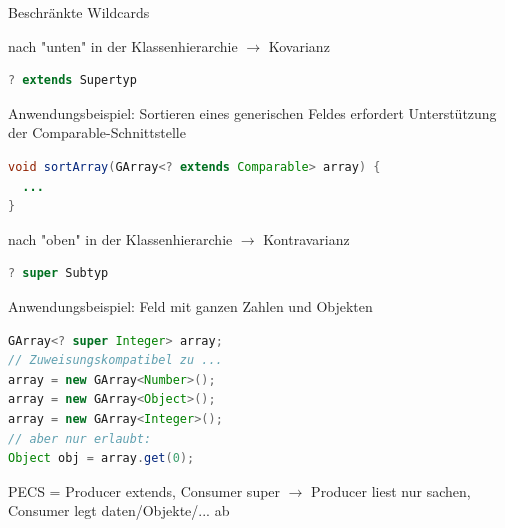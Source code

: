 \documentclass[10pt]{article}
\begin{document}
Beschränkte Wildcards 
\begin{itemize*}
  \item nach "unten" in der Klassenhierarchie $\rightarrow$ Kovarianz
  \begin{lstlisting}[language=java] 
? extends Supertyp 
\end{lstlisting}
  \item Anwendungsbeispiel: Sortieren eines generischen Feldes erfordert Unterstützung der Comparable-Schnittstelle
  \begin{lstlisting}[language=java]
void sortArray(GArray<? extends Comparable> array) {
  ...
}
\end{lstlisting}
  \item nach "oben" in der Klassenhierarchie $\rightarrow$ Kontravarianz
  \begin{lstlisting}[language=java]
? super Subtyp
  \end{lstlisting}
  \item Anwendungsbeispiel: Feld mit ganzen Zahlen und Objekten
  \begin{lstlisting}[language=java]
GArray<? super Integer> array;
// Zuweisungskompatibel zu ...
array = new GArray<Number>();
array = new GArray<Object>();
array = new GArray<Integer>();
// aber nur erlaubt:
Object obj = array.get(0);
  \end{lstlisting}
\end{itemize*}

PECS = Producer extends, Consumer super $\rightarrow$ Producer liest nur sachen, Consumer legt daten/Objekte/... ab
\end{document}

